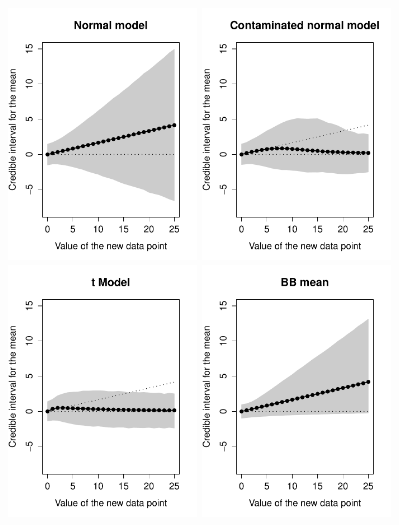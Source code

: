 \documentclass[doc]{apa6}
\begin{document}
{\begin{figure}[p]
    \centering
    \includegraphics[width=5.0cm]{CI_n.pdf}
    \includegraphics[width=5.0cm]{CI_cn.pdf}
    \includegraphics[width=5.0cm]{CI_tModel.pdf}
    \includegraphics[width=5.0cm]{CI_bbm.pdf}

\end{figure}}
\end{document}
